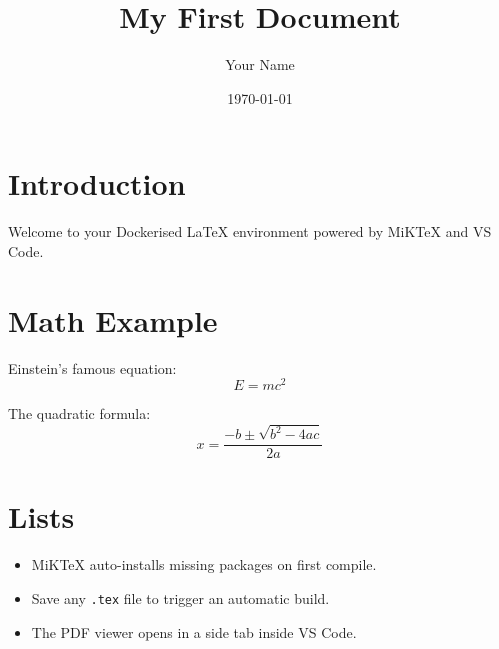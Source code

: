 \documentclass[12pt, a4paper]{article}
\title{My First Document}
\author{Your Name}
\date{\today}
\begin{document}
\maketitle

\section{Introduction}
Welcome to your Dockerised \LaTeX{} environment powered by MiKTeX and VS Code.

\section{Math Example}
Einstein's famous equation:
\begin{equation}
  E = mc^2
\end{equation}

The quadratic formula:
\begin{equation}
  x = \frac{-b \pm \sqrt{b^2 - 4ac}}{2a}
\end{equation}

\section{Lists}
\begin{itemize}
  \item MiKTeX auto-installs missing packages on first compile.
  \item Save any \texttt{.tex} file to trigger an automatic build.
  \item The PDF viewer opens in a side tab inside VS Code.
\end{itemize}
\end{document}
